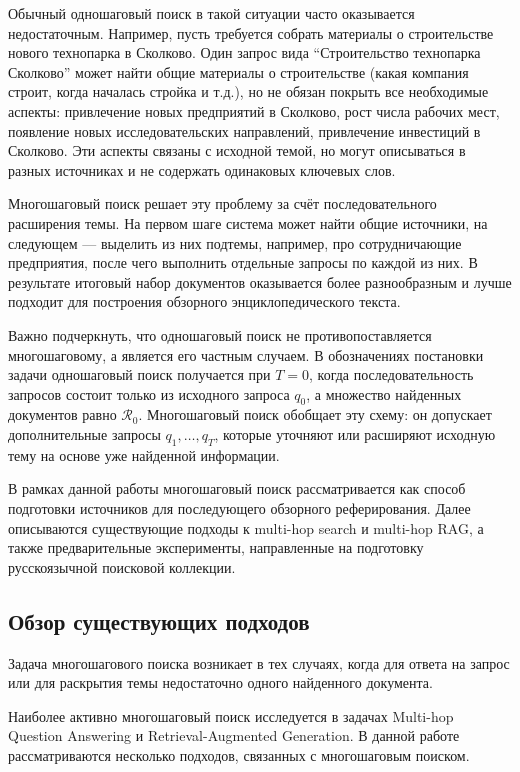 \documentclass[oneside,senior,etd]{BYUPhys}
\begin{document}
Обычный одношаговый поиск в такой ситуации часто оказывается недостаточным. 
Например, пусть требуется собрать материалы о строительстве нового технопарка в Сколково. 
Один запрос вида ``Строительство технопарка Сколково'' может найти общие материалы о строительстве (какая компания строит, когда началась стройка и т.д.), 
но не обязан покрыть все необходимые аспекты: 
привлечение новых предприятий в Сколково, рост числа рабочих мест, появление новых исследовательских направлений, привлечение инвестиций в Сколково.
Эти аспекты связаны с исходной темой, но могут описываться в разных источниках и не содержать одинаковых ключевых слов.

Многошаговый поиск решает эту проблему за счёт последовательного расширения темы. 
На первом шаге система может найти общие источники, на следующем --- выделить из них подтемы, например, про сотрудничающие предприятия, после чего выполнить отдельные запросы по каждой из них. 
В результате итоговый набор документов оказывается более разнообразным и лучше подходит для построения обзорного энциклопедического текста.

Важно подчеркнуть, что одношаговый поиск не противопоставляется многошаговому, а является его частным случаем. 
В обозначениях постановки задачи одношаговый поиск получается при $T=0$, 
когда последовательность запросов состоит только из исходного запроса $q_0$, 
а множество найденных документов равно $\mathcal{R}_0$. 
Многошаговый поиск обобщает эту схему: он допускает дополнительные запросы $q_1, \ldots, q_T$, которые уточняют или расширяют исходную тему на основе уже найденной информации.

В рамках данной работы многошаговый поиск рассматривается как способ подготовки источников для последующего обзорного реферирования. Далее описываются существующие подходы к multi-hop search и multi-hop RAG, а также предварительные эксперименты, направленные на подготовку русскоязычной поисковой коллекции.

\subsection{Обзор существующих подходов}

Задача многошагового поиска возникает в тех случаях, когда для ответа на запрос или для раскрытия темы недостаточно одного найденного документа. 

Наиболее активно многошаговый поиск исследуется в задачах Multi-hop Question Answering и Retrieval-Augmented Generation.
В данной работе рассматриваются несколько подходов, связанных с многошаговым поиском. 
\end{document}
